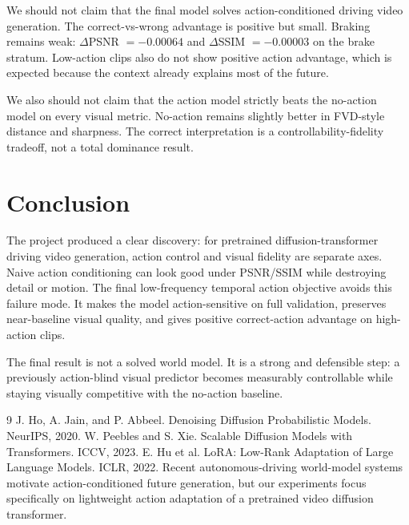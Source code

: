 \documentclass[10pt]{article}
\begin{document}
We should not claim that the final model solves action-conditioned driving video generation. The correct-vs-wrong advantage is positive but small. Braking remains weak: $\Delta$PSNR $=-0.00064$ and $\Delta$SSIM $=-0.00003$ on the brake stratum. Low-action clips also do not show positive action advantage, which is expected because the context already explains most of the future.

We also should not claim that the action model strictly beats the no-action model on every visual metric. No-action remains slightly better in FVD-style distance and sharpness. The correct interpretation is a controllability-fidelity tradeoff, not a total dominance result.

\section{Conclusion}

The project produced a clear discovery: for pretrained diffusion-transformer driving video generation, action control and visual fidelity are separate axes. Naive action conditioning can look good under PSNR/SSIM while destroying detail or motion. The final low-frequency temporal action objective avoids this failure mode. It makes the model action-sensitive on full validation, preserves near-baseline visual quality, and gives positive correct-action advantage on high-action clips.

The final result is not a solved world model. It is a strong and defensible step: a previously action-blind visual predictor becomes measurably controllable while staying visually competitive with the no-action baseline.

\begin{thebibliography}{9}
J. Ho, A. Jain, and P. Abbeel. Denoising Diffusion Probabilistic Models. NeurIPS, 2020.
W. Peebles and S. Xie. Scalable Diffusion Models with Transformers. ICCV, 2023.
E. Hu et al. LoRA: Low-Rank Adaptation of Large Language Models. ICLR, 2022.
Recent autonomous-driving world-model systems motivate action-conditioned future generation, but our experiments focus specifically on lightweight action adaptation of a pretrained video diffusion transformer.
\end{thebibliography}
\end{document}
